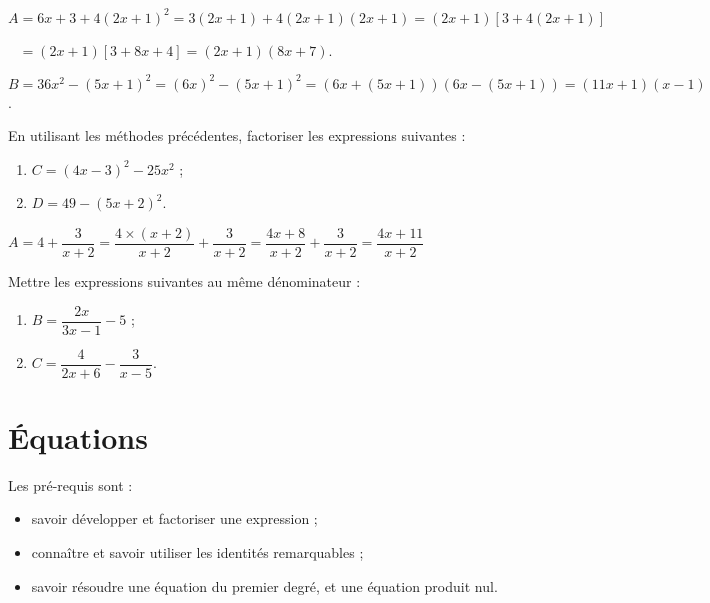 \documentclass[a4paper,11pt]{article}
\begin{document}
\begin{cexemple}[s - Factorisation]
$A=6x+3+4(2x+1)^2=3(2x+1)+4(2x+1)(2x+1)=(2x+1) \left[ 3+ 4(2x+1)\right]$

$\phantom{A}=(2x+1) \left[ 3+ 8x+4\right] = (2x+1)(8x+7)$.

\smallskip

$B=36x^2-(5x+1)^2 = (6x)^2 - (5x+1)^2 = (6x+(5x+1))(6x-(5x+1)) = (11x+1)(x-1)$.
\end{cexemple}

\begin{cexercice}
En utilisant les méthodes précédentes, factoriser les expressions suivantes :
\vspace*{-0.12cm}
\begin{enumerate}
	\item $C = (4x-3)^2-25x^2$ ;
	\item $D = 49 - (5x+2)^2$.
\end{enumerate}
\end{cexercice}

\begin{cexemple}
$A=4 + \dfrac{3}{x+2} = \dfrac{4 \times (x+2)}{x+2}+\dfrac{3}{x+2}=\dfrac{4x+8}{x+2}+\dfrac{3}{x+2} = \dfrac{4x+11}{x+2}$
\end{cexemple}

\begin{cexercice}
Mettre les expressions suivantes au même dénominateur :
\vspace*{-0.12cm}
\begin{enumerate}
	\item $B = \dfrac{2x}{3x-1} - 5$ ;
	\item $C = \dfrac{4}{2x+6} - \dfrac{3}{x-5}$.
\end{enumerate}
\end{cexercice}

\section{Équations}

\begin{cintro}
Les pré-requis sont :
\begin{itemize}[label=\small\faInfoCircle]
	\item savoir développer et factoriser une expression ;
	\item connaître et savoir utiliser les identités remarquables ;
	\item savoir résoudre une équation du premier degré, et une équation produit nul.
\end{itemize}
\end{cintro}
\end{document}
